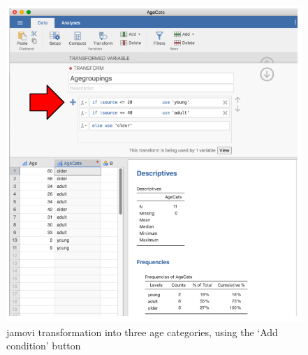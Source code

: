 \documentclass[
]{book}
\begin{document}
\begin{figure}
\includegraphics[width=0.9\linewidth]{images/Figure41} \caption{jamovi transformation into three age categories, using the ‘Add condition’ button}\label{fig:fig6-9}
\end{figure}

 
  \providecommand{\huxb}[2]{\arrayrulecolor[RGB]{#1}\global\arrayrulewidth=#2pt}
  \providecommand{\huxvb}[2]{\color[RGB]{#1}\vrule width #2pt}
  \providecommand{\huxtpad}[1]{\rule{0pt}{#1}}
  \providecommand{\huxbpad}[1]{\rule[-#1]{0pt}{#1}}
\end{document}
